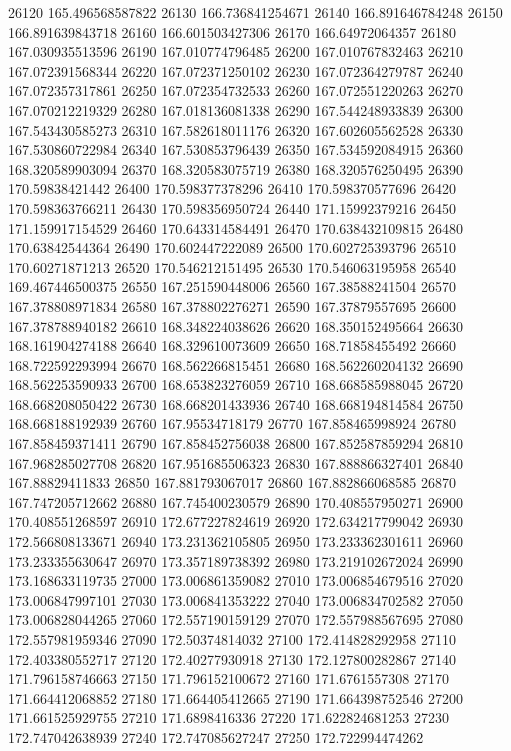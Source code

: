 {26120 165.496568587822
26130 166.736841254671
26140 166.891646784248
26150 166.891639843718
26160 166.601503427306
26170 166.64972064357
26180 167.030935513596
26190 167.010774796485
26200 167.010767832463
26210 167.072391568344
26220 167.072371250102
26230 167.072364279787
26240 167.072357317861
26250 167.072354732533
26260 167.072551220263
26270 167.070212219329
26280 167.018136081338
26290 167.544248933839
26300 167.543430585273
26310 167.582618011176
26320 167.602605562528
26330 167.530860722984
26340 167.530853796439
26350 167.534592084915
26360 168.320589903094
26370 168.320583075719
26380 168.320576250495
26390 170.59838421442
26400 170.598377378296
26410 170.598370577696
26420 170.598363766211
26430 170.598356950724
26440 171.15992379216
26450 171.159917154529
26460 170.643314584491
26470 170.638432109815
26480 170.63842544364
26490 170.602447222089
26500 170.602725393796
26510 170.60271871213
26520 170.546212151495
26530 170.546063195958
26540 169.467446500375
26550 167.251590448006
26560 167.38588241504
26570 167.378808971834
26580 167.378802276271
26590 167.37879557695
26600 167.378788940182
26610 168.348224038626
26620 168.350152495664
26630 168.161904274188
26640 168.329610073609
26650 168.71858455492
26660 168.722592293994
26670 168.562266815451
26680 168.562260204132
26690 168.562253590933
26700 168.653823276059
26710 168.668585988045
26720 168.668208050422
26730 168.668201433936
26740 168.668194814584
26750 168.668188192939
26760 167.95534718179
26770 167.858465998924
26780 167.858459371411
26790 167.858452756038
26800 167.852587859294
26810 167.968285027708
26820 167.951685506323
26830 167.888866327401
26840 167.88829411833
26850 167.881793067017
26860 167.882866068585
26870 167.747205712662
26880 167.745400230579
26890 170.408557950271
26900 170.408551268597
26910 172.677227824619
26920 172.634217799042
26930 172.566808133671
26940 173.231362105805
26950 173.233362301611
26960 173.233355630647
26970 173.357189738392
26980 173.219102672024
26990 173.168633119735
27000 173.006861359082
27010 173.006854679516
27020 173.006847997101
27030 173.006841353222
27040 173.006834702582
27050 173.006828044265
27060 172.557190159129
27070 172.557988567695
27080 172.557981959346
27090 172.50374814032
27100 172.414828292958
27110 172.403380552717
27120 172.40277930918
27130 172.127800282867
27140 171.796158746663
27150 171.796152100672
27160 171.6761557308
27170 171.664412068852
27180 171.664405412665
27190 171.664398752546
27200 171.661525929755
27210 171.6898416336
27220 171.622824681253
27230 172.747042638939
27240 172.747085627247
27250 172.722994474262
}
